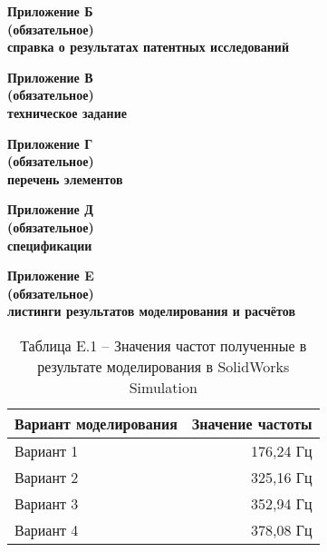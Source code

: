 
\newpage


\begin{center}
\textbf{Приложение Б}\\
\textbf{(обязательное)}\\
\textbf{справка о результатах патентных исследований}
\end{center}
\newpage

\begin{center}
  \textbf{Приложение В}\\
  \textbf{(обязательное)}\\
  \textbf{техническое задание}
\end{center}
\newpage

\begin{center}
  \textbf{Приложение Г}\\
  \textbf{(обязательное)}\\
  \textbf{перечень элементов}
\end{center}
\newpage

\begin{center}
  \textbf{Приложение Д}\\
  \textbf{(обязательное)}\\
  \textbf{спецификации}
\end{center}
\newpage

\begin{center}
  \textbf{Приложение E}\\
  \textbf{(обязательное)}\\
  \textbf{листинги результатов моделирования и расчётов}
\end{center}

  

 
\begin{table}[H]
  \centering
  \caption{Таблица E.1 – Значения частот полученные в результате моделирования в SolidWorks Simulation}
  \begin{tabular}{|l | r |}
    \hline
    Вариант моделирования & Значение частоты \\ \hline
    Вариант 1 & 176,24 Гц\\ \hline
    Вариант 2 & 325,16 Гц\\ \hline
    Вариант 3 & 352,94 Гц \\ \hline
    Вариант 4 & 378,08 Гц \\ \hline
  \end{tabular}
\end{table}

